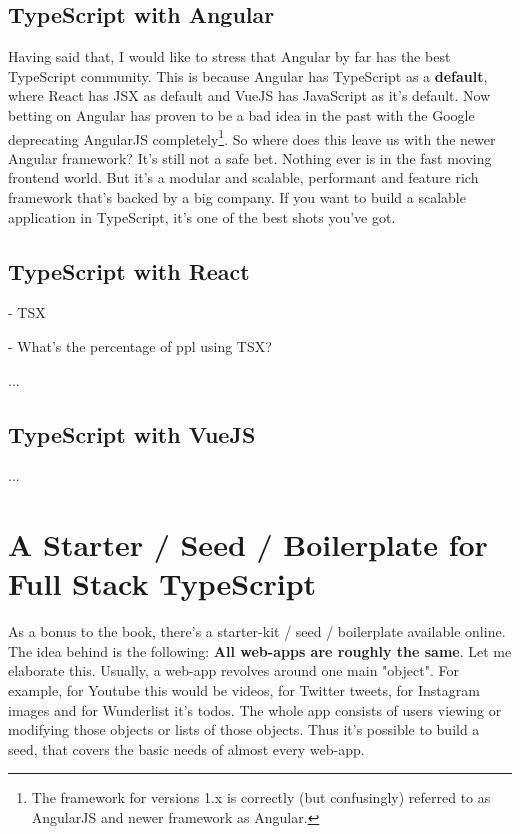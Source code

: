 \documentclass[12pt,a4paper]{report}
\begin{document}
\section{TypeScript with Angular}

Having said that, I would like to stress that Angular by far has the best TypeScript community. This is because Angular has TypeScript as a \textbf{default}, where React has JSX as default and VueJS has JavaScript as it's default. Now betting on Angular has proven to be a bad idea in the past with the Google deprecating AngularJS completely\footnote{The framework for versions 1.x is correctly (but confusingly) referred to as AngularJS and newer framework as Angular.}. So where does this leave us with the newer Angular framework? It's still not a safe bet. Nothing ever is in the fast moving frontend world. But it's  a modular and scalable, performant and feature rich framework that's backed by a big company. If you want to build a scalable application in TypeScript, it's one of the best shots you've got.


\section{TypeScript with React}

- TSX

- What's the percentage of ppl using TSX?

...


\section{TypeScript with VueJS}

...


\chapter{A Starter / Seed / Boilerplate for Full Stack TypeScript}

As a bonus to the book, there's a starter-kit / seed / boilerplate available online. The idea behind is the following: \textbf{All web-apps are roughly the same}. Let me elaborate this. Usually, a web-app revolves around one main "object". For example, for Youtube this would be videos, for Twitter tweets, for Instagram images and for Wunderlist it's todos. The whole app consists of users viewing or modifying those objects or lists of those objects. Thus it's possible to build a seed, that covers the basic needs of almost every web-app.
\end{document}
